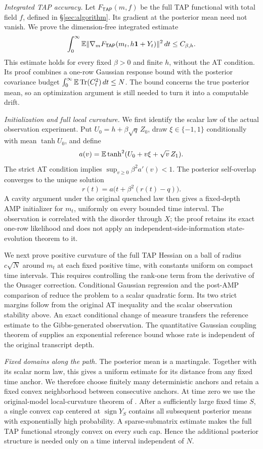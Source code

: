 \documentclass[11pt,reqno]{amsart}
\def\tap{{\mathsf{TAP}}}
\newcommand{\Tr}{\operatorname{Tr}}
\newcommand{\sign}{\operatorname{sign}}
\begin{document}
\emph{Integrated TAP accuracy.}
Let $ F_{\tap}(m,f)$ be the full TAP functional with total field $f$, defined in \S\ref{sec:algorithm}. Its gradient at the posterior mean need not vanish. We prove the dimension-free integrated estimate
\[
 \int_0^\infty\bbE\|\nabla_m F_{\tap}(m_t,h\bone+Y_t)\|^2\,dt
 \le C_{\beta,h}.
\]
This estimate holds for every fixed $\beta>0$ and finite $h$, without the AT condition. Its proof combines a one-row Gaussian response bound with the posterior covariance budget $\int_0^\infty\bbE\Tr(C_t^2)\,dt\le N$. The bound concerns the true posterior mean, so an optimization argument is still needed to turn it into a computable drift.

\emph{Initialization and full local curvature.}
We first identify the scalar law of the actual observation experiment. Put $U_0=h+\beta\sqrt q\,Z_0$, draw $\xi\in\{-1,1\}$ conditionally with mean $\tanh U_0$, and define
\[
 a(v)={\mathbb{E}}\tanh^2(U_0+v\xi+\sqrt v\,Z_1).
\]
The strict AT condition implies $\sup_{v\ge0}\beta^2a'(v)<1$. The posterior self-overlap converges to the unique solution
\[
 r(t)=a\bigl(t+\beta^2(r(t)-q)\bigr).
\]
A cavity argument under the original quenched law then gives a fixed-depth AMP initializer for $m_t$, uniformly on every bounded time interval. The observation is correlated with the disorder through $X$; the proof retains its exact one-row likelihood and does not apply an independent-side-information state-evolution theorem to it.

We next prove positive curvature of the full TAP Hessian on a ball of radius $c\sqrt N$ around $m_t$ at each fixed positive time, with constants uniform on compact time intervals. This requires controlling the rank-one term from the derivative of the Onsager correction. Conditional Gaussian regression and the post-AMP comparison of \cite{celentano2024sudakov} reduce the problem to a scalar quadratic form. Its two strict margins follow from the original AT inequality and the scalar observation stability above. An exact conditional change of measure transfers the reference estimate to the Gibbs-generated observation. The quantitative Gaussian coupling theorem of \cite[Theorem~4]{reeves2025dimension} supplies an exponential reference bound whose rate is independent of the original transcript depth.

\emph{Fixed domains along the path.}
The posterior mean is a martingale. Together with its scalar norm law, this gives a uniform estimate for its distance from any fixed time anchor. We therefore choose finitely many deterministic anchors and retain a fixed convex neighborhood between consecutive anchors. At time zero we use the original-model local-curvature theorem of \cite[Proposition~4.5]{brennecke2023operator}. After a sufficiently large fixed time $S$, a single convex cap centered at $\sign Y_S$ contains all subsequent posterior means with exponentially high probability. A sparse-submatrix estimate makes the full TAP functional strongly convex on every such cap. Hence the additional posterior structure is needed only on a time interval independent of $N$.
\end{document}
